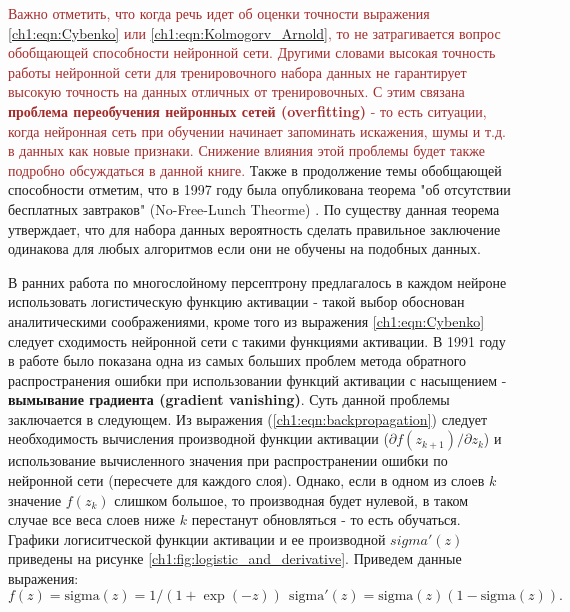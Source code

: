 \documentclass[12pt]{article}
\begin{document}
\begin{sloppypar}
\textcolor{brown}{
Важно отметить, что когда речь идет об оценки точности выражения \ref{ch1:eqn:Cybenko} или \ref{ch1:eqn:Kolmogorv_Arnold}, то не затрагивается вопрос обобщающей способности нейронной сети. Другими словами высокая точность работы нейронной сети для тренировочного набора данных не гарантирует высокую точность на данных отличных от тренировочных. С этим связана \textbf{проблема переобучения нейронных сетей (overfitting)} - то есть ситуации, когда нейронная сеть при обучении начинает запоминать искажения, шумы и т.д. в данных как новые признаки. Снижение влияния этой проблемы будет также подробно обсуждаться в данной книге.}  
Также в продолжение темы обобщающей способности отметим, что в 1997 году была опубликована теорема "об отсутствии бесплатных завтраков" (No-Free-Lunch Theorme) \cite{wolpert1997no}. По существу данная теорема утверждает, что для набора данных вероятность сделать правильное заключение одинакова для любых алгоритмов если они не обучены на подобных данных.

В ранних работа по многослойному персептрону предлагалось в каждом нейроне использовать логистическую функцию активации - такой выбор обоснован аналитическими соображениями, кроме того из выражения \ref{ch1:eqn:Cybenko} следует сходимость нейронной сети с такими функциями активации. В 1991 году в работе \cite{hochreiter1991untersuchungen} было показана одна из самых больших проблем метода обратного распространения ошибки при использовании функций активации с насыщением - \textbf{вымывание градиента (gradient vanishing)}. Суть данной проблемы заключается в следующем. Из выражения (\ref{ch1:eqn:backpropagation}) следует  необходимость вычисления производной функции активации 
($\partial f(z_{k+1})/\partial z_k$) и использование вычисленного значения при распространении ошибки по нейронной сети (пересчете для каждого слоя). Однако, если в одном из слоев $k$ значение $f(z_{k})$ слишком большое, то производная будет нулевой, в таком случае все веса слоев ниже $k$ перестанут обновляться - то есть обучаться.  Графики логиситческой функции активации и ее производной $sigma'(z)$ приведены на рисунке \ref{ch1:fig:logistic_and_derivative}. Приведем данные выражения:
    \begin{equation}
    \label{ch1:eqn:logistic_and_derivative}
        f(z) = \mathrm{sigma}(z) = 1/(1+\exp(-z)) \ \ \mathrm{sigma}'(z) = \mathrm{sigma}(z)(1-\mathrm{sigma}(z)).
    \end{equation}


\end{sloppypar}
\end{document}
